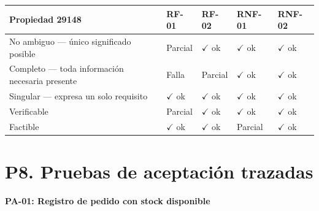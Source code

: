 \documentclass{article}
\begin{document}
\begin{table}[H]
\centering
\small
\setlength{\tabcolsep}{4pt}
\begin{tabular}{|p{3.8cm}|p{1.8cm}|p{1.8cm}|p{1.8cm}|p{1.8cm}|}
\hline
\rowcolor{lightblue}
\textbf{Propiedad 29148} & \textbf{RF-01} & \textbf{RF-02} & \textbf{RNF-01} & \textbf{RNF-02} \\
\hline
No ambiguo — único significado posible
  & \cellcolor{lightyellow}Parcial
  & \cellcolor{lightgreen}$\checkmark$ ok
  & \cellcolor{lightgreen}$\checkmark$ ok
  & \cellcolor{lightgreen}$\checkmark$ ok \\
\hline
Completo — toda información necesaria presente
  & \cellcolor{lightred}Falla
  & \cellcolor{lightyellow}Parcial
  & \cellcolor{lightgreen}$\checkmark$ ok
  & \cellcolor{lightgreen}$\checkmark$ ok \\
\hline
Singular — expresa un solo requisito
  & \cellcolor{lightgreen}$\checkmark$ ok
  & \cellcolor{lightgreen}$\checkmark$ ok
  & \cellcolor{lightgreen}$\checkmark$ ok
  & \cellcolor{lightgreen}$\checkmark$ ok \\
\hline
Verificable
  & \cellcolor{lightyellow}Parcial
  & \cellcolor{lightgreen}$\checkmark$ ok
  & \cellcolor{lightgreen}$\checkmark$ ok
  & \cellcolor{lightgreen}$\checkmark$ ok \\
\hline
Factible
  & \cellcolor{lightgreen}$\checkmark$ ok
  & \cellcolor{lightgreen}$\checkmark$ ok
  & \cellcolor{lightyellow}Parcial
  & \cellcolor{lightgreen}$\checkmark$ ok \\
\hline
\end{tabular}
\end{table}

 \newpage
\section{P8. Pruebas de aceptación trazadas}

\textbf{PA-01: Registro de pedido con stock disponible}
\vspace{0.2cm}
\end{document}

